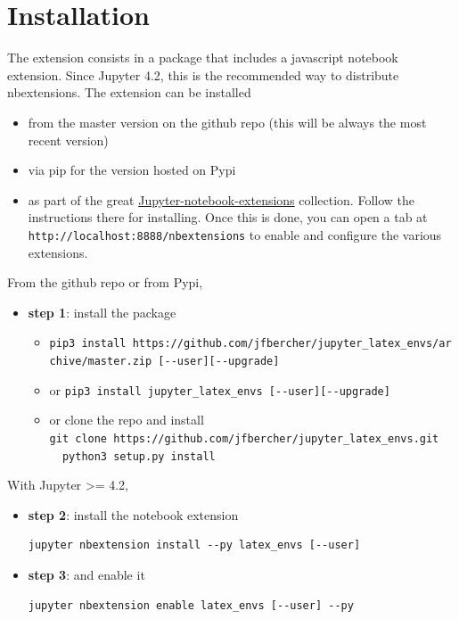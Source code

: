     \section{Installation}\label{installation}

    The extension consists in a package that includes a javascript notebook
extension. Since Jupyter 4.2, this is the recommended way to distribute
nbextensions. The extension can be installed

\begin{itemize}
\tightlist
\item
  from the master version on the github repo (this will be always the
  most recent version)
\item
  via pip for the version hosted on Pypi
\item
  as part of the great
  \href{https://github.com/ipython-contrib/Jupyter-notebook-extensions}{Jupyter-notebook-extensions}
  collection. Follow the instructions there for installing. Once this is
  done, you can open a tab at
  \texttt{http://localhost:8888/nbextensions} to enable and configure
  the various extensions.
\end{itemize}

From the github repo or from Pypi,

\begin{itemize}
\tightlist
\item
  \textbf{step 1}: install the package

  \begin{itemize}
  \tightlist
  \item
    \texttt{pip3\ install\ https://github.com/jfbercher/jupyter\_latex\_envs/archive/master.zip\ {[}-\/-user{]}{[}-\/-upgrade{]}}
  \item
    { or}
    \texttt{pip3\ install\ jupyter\_latex\_envs\ {[}-\/-user{]}{[}-\/-upgrade{]}}
  \item
    { or} clone the repo and install
    \texttt{git\ clone\ https://github.com/jfbercher/jupyter\_latex\_envs.git\ \ \ \ python3\ setup.py\ install}
  \end{itemize}
\end{itemize}

With Jupyter \textgreater{}= 4.2,

\begin{itemize}
\item
  \textbf{step 2}: install the notebook extension

\begin{verbatim}
jupyter nbextension install --py latex_envs [--user]
\end{verbatim}
\item
  \textbf{step 3}: and enable it

\begin{verbatim}
jupyter nbextension enable latex_envs [--user] --py
\end{verbatim}
\end{itemize}

